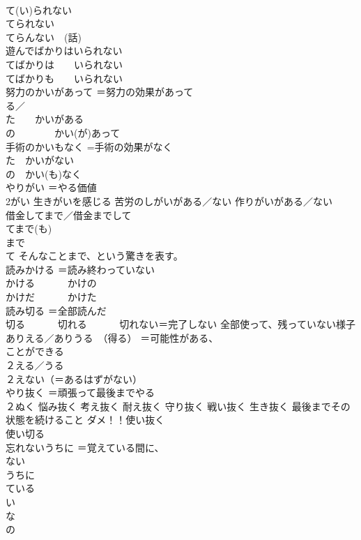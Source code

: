 \documentclass[8pt]{extreport}
\begin{document}
\begin{CJK}{UTF8}{min}
\\	て(い)られない 
\\	てられない 
\\	てらんない　(話)
\\	遊んでばかりはいられない	
\\	てばかりは　　いられない 
\\	てばかりも　　いられない
\\	努力のかいがあって	＝努力の効果があって
\\	る／
\\	た　　かいがある 
\\	の　　　　かい(が)あって
\\	手術のかいもなく	=手術の効果がなく
\\	た　かいがない 
\\	の　かい(も)なく~
\\	やりがい	＝やる価値 
\\	2がい 生きがいを感じる 苦労のしがいがある／ない 作りがいがある／ない
\\	借金してまで／借金までして	
\\	てまで(も) 
\\	まで
\\	て そんなことまで、という驚きを表す。
\\	読みかける	＝読み終わっていない 
\\	かける 　　　かけの
\\	かけだ 　　　かけた
\\	読み切る	＝全部読んだ 
\\	切る 　　　切れる 　　　切れない＝完了しない 全部使って、残っていない様子
\\	ありえる／ありうる　（得る）	＝可能性がある、
\\	ことができる 
\\	２える／うる 
\\	２えない（＝あるはずがない）
\\	やり抜く	＝頑張って最後までやる 
\\	２ぬく 悩み抜く 考え抜く 耐え抜く 守り抜く 戦い抜く 生き抜く 最後までその状態を続けること ダメ！！使い抜く
\\	使い切る
\\	忘れないうちに	＝覚えている間に、
\\	ない　　　　　
\\	うちに 
\\	ている　　　　
\\	い　　　　　　
\\	な　　　 　　
\\	の　　　　 

\end{CJK}
\end{document}

